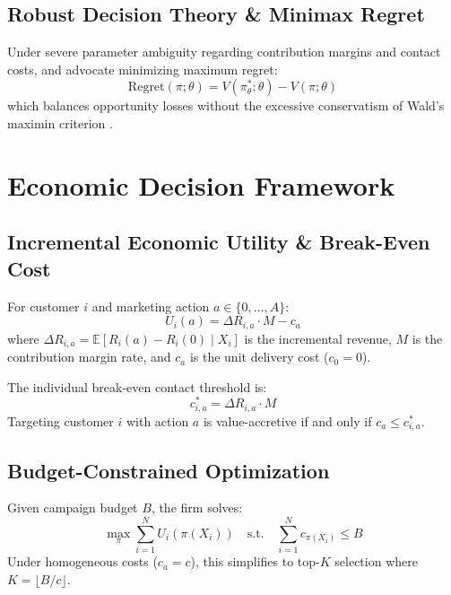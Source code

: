 \documentclass[11pt,a4paper]{article}
\begin{document}
\subsection{Robust Decision Theory \& Minimax Regret}
Under severe parameter ambiguity regarding contribution margins and contact costs, \citet{savage1951theory} and \citet{manski2000identification} advocate minimizing maximum regret:
\begin{equation}
\text{Regret}(\pi; \theta) = V(\pi^*_\theta; \theta) - V(\pi; \theta)
\end{equation}
which balances opportunity losses without the excessive conservatism of Wald's maximin criterion \citep{wald1945statistical, stoye2009minimax, bertsimas2016robust}.

\section{Economic Decision Framework}

\subsection{Incremental Economic Utility \& Break-Even Cost}
For customer $i$ and marketing action $a \in \{0, \dots, A\}$:
\begin{equation}
U_i(a) = \Delta R_{i, a} \cdot M - c_a
\end{equation}
where $\Delta R_{i, a} = \mathbb{E}[R_i(a) - R_i(0) \mid X_i]$ is the incremental revenue, $M$ is the contribution margin rate, and $c_a$ is the unit delivery cost ($c_0 = 0$).

The individual break-even contact threshold is:
\begin{equation}
c^*_{i, a} = \Delta R_{i, a} \cdot M
\end{equation}
Targeting customer $i$ with action $a$ is value-accretive if and only if $c_a \le c^*_{i, a}$.

\subsection{Budget-Constrained Optimization}
Given campaign budget $B$, the firm solves:
\begin{equation}
\max_{\pi} \sum_{i=1}^N U_i(\pi(X_i)) \quad \text{s.t.} \quad \sum_{i=1}^N c_{\pi(X_i)} \le B
\end{equation}
Under homogeneous costs ($c_a = c$), this simplifies to top-$K$ selection where $K = \lfloor B/c \rfloor$.
\end{document}
